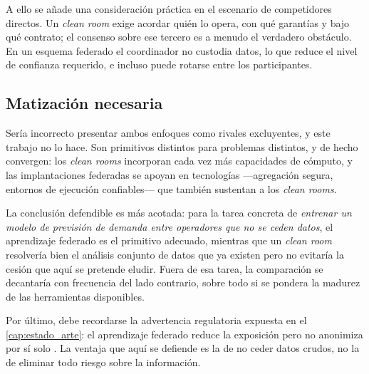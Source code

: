 A ello se añade una consideración práctica en el escenario de competidores directos. Un
\emph{clean room} exige acordar quién lo opera, con qué garantías y bajo qué contrato; el consenso
sobre ese tercero es a menudo el verdadero obstáculo. En un esquema federado el coordinador no
custodia datos, lo que reduce el nivel de confianza requerido, e incluso puede rotarse entre los
participantes.

\subsection{Matización necesaria}

Sería incorrecto presentar ambos enfoques como rivales excluyentes, y este trabajo no lo hace. Son
primitivos distintos para problemas distintos, y de hecho convergen: los \emph{clean rooms}
incorporan cada vez más capacidades de cómputo, y las implantaciones federadas se apoyan en
tecnologías —agregación segura, entornos de ejecución confiables— que también sustentan a los
\emph{clean rooms}.

La conclusión defendible es más acotada: para la tarea concreta de \emph{entrenar un modelo de
previsión de demanda entre operadores que no se ceden datos}, el aprendizaje federado es el
primitivo adecuado, mientras que un \emph{clean room} resolvería bien el análisis conjunto de datos
que ya existen pero no evitaría la cesión que aquí se pretende eludir. Fuera de esa tarea, la
comparación se decantaría con frecuencia del lado contrario, sobre todo si se pondera la madurez de
las herramientas disponibles.

Por último, debe recordarse la advertencia regulatoria expuesta en el \cref{cap:estado_arte}: el
aprendizaje federado reduce la exposición pero no anonimiza por sí solo \parencite{aepdedps2025}. La
ventaja que aquí se defiende es la de no ceder datos crudos, no la de eliminar todo riesgo sobre la
información.
